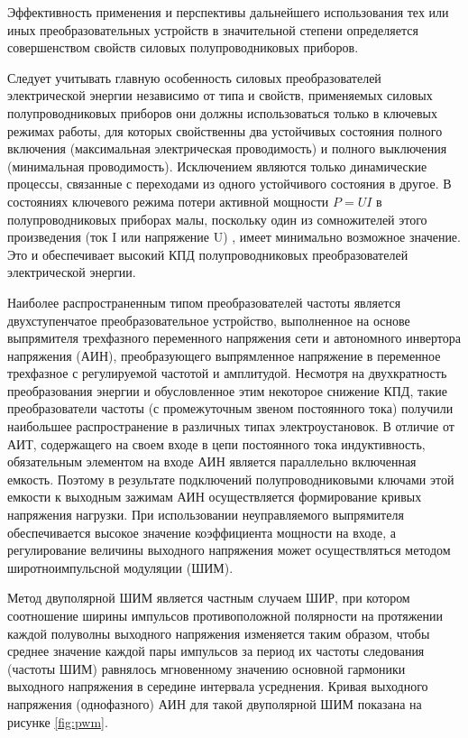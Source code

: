         Эффективность применения и перспективы дальнейшего использования тех
        или иных преобразовательных устройств в значительной степени
        определяется совершенством свойств силовых полупроводниковых приборов.

        Следует учитывать главную особенность силовых преобразователей
        электрической энергии независимо от типа и свойств, применяемых
        силовых полупроводниковых приборов они должны использоваться только в
        ключевых режимах работы, для которых свойственны два устойчивых
        состояния полного включения (максимальная электрическая проводимость) и
        полного выключения (минимальная проводимость). Исключением являются
        только динамические процессы, связанные с переходами из одного
        устойчивого состояния в другое. В состояниях ключевого режима потери
        активной мощности $P=UI$ в полупроводниковых приборах малы, поскольку
        один из сомножителей этого произведения (ток I или напряжение U) ,
        имеет минимально возможное значение. Это и обеспечивает высокий КПД
        полупроводниковых преобразователей электрической энергии.

        Наиболее распространенным типом преобразователей частоты является
        двухступенчатое преобразовательное устройство, выполненное на основе
        выпрямителя трехфазного переменного напряжения сети и автономного
        инвертора напряжения (АИН), преобразующего выпрямленное напряжение в
        переменное трехфазное с регулируемой частотой и амплитудой. Несмотря на
        двухкратность преобразования энергии и обусловленное этим некоторое
        снижение КПД, такие преобразователи частоты (с промежуточным звеном
        постоянного тока) получили наибольшее распространение в различных типах
        электроустановок. В отличие от АИТ, содержащего на своем входе в цепи
        постоянного тока индуктивность, обязательным элементом на входе АИН
        является параллельно включенная емкость. Поэтому в результате
        подключений полупроводниковыми ключами этой емкости к выходным зажимам
        АИН осуществляется формирование кривых напряжения нагрузки. При
        использовании неуправляемого выпрямителя обеспечивается высокое
        значение коэффициента мощности на входе, а регулирование величины
        выходного напряжения может осуществляться методом широтноимпульсной
        модуляции (ШИМ).

        Метод двуполярной ШИМ является частным случаем ШИР, при котором
        соотношение ширины импульсов противоположной полярности на протяжении
        каждой полуволны выходного напряжения изменяется таким образом, чтобы
        среднее значение каждой пары импульсов за период их частоты следования
        (частоты ШИМ) равнялось мгновенному значению основной гармоники
        выходного напряжения в середине интервала усреднения. Кривая выходного
        напряжения (однофазного) АИН для такой двуполярной ШИМ показана на
        рисунке \ref{fig:pwm}.

